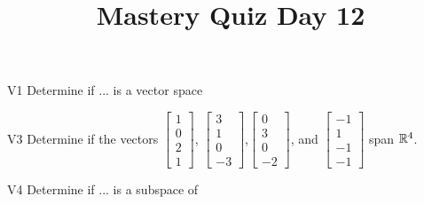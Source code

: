 \documentclass{sbgLAquiz}
\title{Mastery Quiz Day 12 }
\begin{document}
\begin{problem}{V1}
Determine if ... is a vector space
\end{problem}
\begin{solution}

\end{solution}

\begin{problem}{V3}
Determine if the vectors $\begin{bmatrix} 1 \\ 0 \\ 2 \\1 \end{bmatrix}$, $\begin{bmatrix} 3 \\ 1 \\ 0 \\ -3 \end{bmatrix}$,$\begin{bmatrix} 0 \\ 3 \\ 0 \\ -2 \end{bmatrix}$, and $\begin{bmatrix}-1 \\ 1 \\ -1 \\ -1 \end{bmatrix}$ span $\mathbb{R}^4$.
\end{problem}
\begin{solution}
\end{solution}
\begin{extract}\newpage\end{extract}
\begin{problem}{V4}
Determine if ... is a subspace of 
\end{problem}
\end{document}

